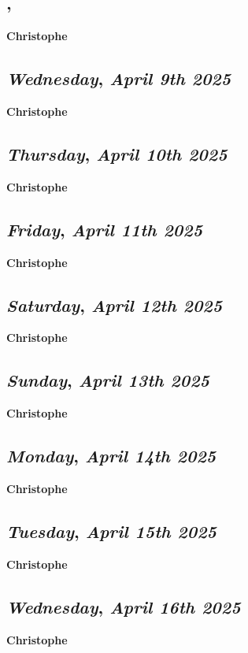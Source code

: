 \subsection*{\weekday, \day}
\textbf {Christophe}

\def\day{\textit{April 9th 2025}}
\def\weekday{\textit{Wednesday}}
\subsection*{\weekday, \day}
\textbf {Christophe}

\def\day{\textit{April 10th 2025}}
\def\weekday{\textit{Thursday}}
\subsection*{\weekday, \day}
\textbf {Christophe}

\def\day{\textit{April 11th 2025}}
\def\weekday{\textit{Friday}}
\subsection*{\weekday, \day}
\textbf {Christophe}

\def\day{\textit{April 12th 2025}}
\def\weekday{\textit{Saturday}}
\subsection*{\weekday, \day}
\textbf {Christophe}

\def\day{\textit{April 13th 2025}}
\def\weekday{\textit{Sunday}}
\subsection*{\weekday, \day}
\textbf {Christophe}

\def\day{\textit{April 14th 2025}}
\def\weekday{\textit{Monday}}
\subsection*{\weekday, \day}
\textbf {Christophe}

\def\day{\textit{April 15th 2025}}
\def\weekday{\textit{Tuesday}}
\subsection*{\weekday, \day}
\textbf {Christophe}

\def\day{\textit{April 16th 2025}}
\def\weekday{\textit{Wednesday}}
\subsection*{\weekday, \day}
\textbf {Christophe}

